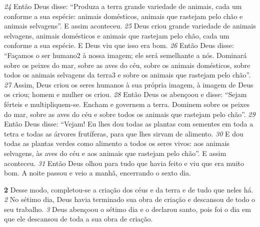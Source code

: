 \bigskip
\textit{\tiny 24}
Então Deus disse: “Produza a terra grande variedade de animais, cada um conforme a sua espécie: animais domésticos, animais que rastejam pelo chão e animais selvagens”. E assim aconteceu. 
\textit{\tiny 25}
Deus criou grande variedade de animais selvagens, animais domésticos e animais que rastejam pelo chão, cada um conforme a sua espécie. E Deus viu que isso era bom.
\textit{\tiny 26}
Então Deus disse: “Façamos o ser humano2 à nossa imagem; ele será semelhante a nós. Dominará sobre os peixes do mar, sobre as aves do céu, sobre os animais domésticos, sobre todos os animais selvagens da terra3 e sobre os animais que rastejam pelo chão”.
\textit{\tiny 27}
Assim, Deus criou os seres humanos à sua própria imagem, à imagem de Deus os criou; homem e mulher os criou.
\textit{\tiny 28}
Então  Deus os abençoou e disse: “Sejam férteis e multipliquem-se. Encham e governem a terra. Dominem sobre os peixes do mar, sobre as aves do céu e sobre todos os animais que rastejam pelo chão”.
\textit{\tiny 29}
Então Deus disse: “Vejam! Eu lhes dou todas as plantas com sementes em toda a tetra e todas as árvores frutíferas, para que lhes sirvam de alimento. 
\textit{\tiny 30}
E dou todas as plantas verdes como alimento a todos os seres vivos: aos animais selvagens, às aves do céu e aos animais que rastejam pelo chão”. E assim aconteceu.
\textit{\tiny 31}
Então Deus olhou para tudo que havia feito e viu que era muito bom. A noite passou e veio a manhã, encerrando o sexto dia.

\bigskip
\textbf{\large 2} 
Desse modo, completou-se a criação dos céus e da terra e de tudo que neles há. 
\textit{\tiny 2}
No sétimo dia, Deus havia terminado sua obra de criação e descansou de todo o seu trabalho. 
\textit{\tiny 3}
Deus abençoou o sétimo dia e o declarou santo, pois foi o dia em que ele descansou de toda a sua obra de criação.

